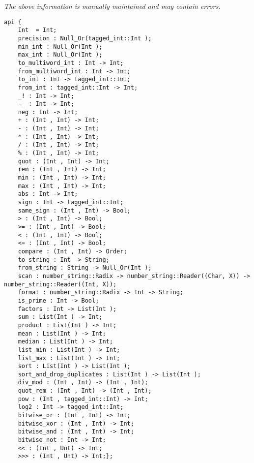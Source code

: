 \label{api:Multiword\_Int}

{\tiny \it The above information is manually maintained and may contain errors.}
\begin{verbatim}
api {
    Int  = Int;
    precision : Null_Or(tagged_int::Int );
    min_int : Null_Or(Int );
    max_int : Null_Or(Int );
    to_multiword_int : Int -> Int;
    from_multiword_int : Int -> Int;
    to_int : Int -> tagged_int::Int;
    from_int : tagged_int::Int -> Int;
    _! : Int -> Int;
    -_ : Int -> Int;
    neg : Int -> Int;
    + : (Int , Int) -> Int;
    - : (Int , Int) -> Int;
    * : (Int , Int) -> Int;
    / : (Int , Int) -> Int;
    % : (Int , Int) -> Int;
    quot : (Int , Int) -> Int;
    rem : (Int , Int) -> Int;
    min : (Int , Int) -> Int;
    max : (Int , Int) -> Int;
    abs : Int -> Int;
    sign : Int -> tagged_int::Int;
    same_sign : (Int , Int) -> Bool;
    > : (Int , Int) -> Bool;
    >= : (Int , Int) -> Bool;
    < : (Int , Int) -> Bool;
    <= : (Int , Int) -> Bool;
    compare : (Int , Int) -> Order;
    to_string : Int -> String;
    from_string : String -> Null_Or(Int );
    scan : number_string::Radix -> number_string::Reader((Char, X)) -> number_string::Reader((Int, X));
    format : number_string::Radix -> Int -> String;
    is_prime : Int -> Bool;
    factors : Int -> List(Int );
    sum : List(Int ) -> Int;
    product : List(Int ) -> Int;
    mean : List(Int ) -> Int;
    median : List(Int ) -> Int;
    list_min : List(Int ) -> Int;
    list_max : List(Int ) -> Int;
    sort : List(Int ) -> List(Int );
    sort_and_drop_duplicates : List(Int ) -> List(Int );
    div_mod : (Int , Int) -> (Int , Int);
    quot_rem : (Int , Int) -> (Int , Int);
    pow : (Int , tagged_int::Int) -> Int;
    log2 : Int -> tagged_int::Int;
    bitwise_or : (Int , Int) -> Int;
    bitwise_xor : (Int , Int) -> Int;
    bitwise_and : (Int , Int) -> Int;
    bitwise_not : Int -> Int;
    << : (Int , Unt) -> Int;
    >>> : (Int , Unt) -> Int;};
\end{verbatim}\index[fun]{>>>}
\index[fun]{<<}
\index[fun]{<=}
\index[fun]{<}
\index[fun]{>=}
\index[fun]{>}
\index[fun]{\%}
\index[fun]{/}
\index[fun]{*}
\index[fun]{-}
\index[fun]{+}
\index[fun]{-\_}
